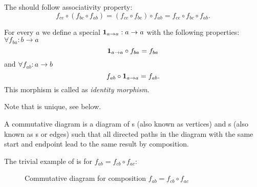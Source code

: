 \begin{axiom}[Associativity]
  \label{axm:associativity}
  The   should
  follow associativity property:
  \[
  f_{ce} \circ (f_{bc} \circ f_{ab}) = (f_{ce} \circ f_{bc}) \circ
  f_{ab} = f_{ce} \circ f_{bc} \circ f_{ab}.
  \]
\end{axiom}

\begin{definition}
  \label{def:id}
  For every  $a$ we define a special
   $\mathbf{1}_{ a \to a } : a \rightarrow a$ with the
  following properties: $\forall f_{ba} : b \rightarrow a$
  \begin{equation}
    \mathbf{1}_{ a \to a } \circ f_{ba} = f_{ba}
    \label{eq:leftid}
  \end{equation}
  and
  $\forall f_{ab} : a \rightarrow b$
  \begin{equation}
    f_{ab} \circ \mathbf{1}_{ a \to a }  = f_{ab}.
    \label{eq:rightid}
  \end{equation}
  This morphism is called as \textit{identity morphism}.
\end{definition}

Note that  is unique, see
 below.

\begin{definition}
  \label{def:commutative_diagram}
  A commutative diagram is a diagram of s (also known as
  vertices) and s (also known as s or
  edges) such that all directed paths in the diagram with the same
  start and endpoint lead to the same result by composition.
\end{definition}

\begin{example}
  \label{ex:commutative_diagram}
  The trivial example of  is
   for $f_{ab} = f_{cb} \circ f_{ac}$:
  \begin{figure}[H]
    \centering
    \caption{Commutative diagram for composition $f_{ab} = f_{cb} \circ f_{ac}$}
    \label{fig:composition_commutative_diagramm}
  \end{figure}
\end{example}


